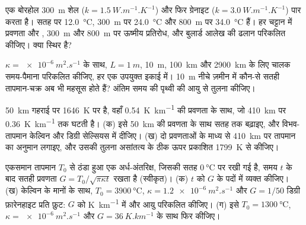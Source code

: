 \begin{exercise}[$\star\star$]\label{exo:b1:heat-budget:6}
एक बोरहोल \qty{300}{m} शेल ($k = \qty{1.5}{W.m^{-1}.K^{-1}}$) और फिर ग्रेनाइट ($k = \qty{3.0}{W.m^{-1}.K^{-1}}$) पार करता है।  सतह पर \qty{12.0}{\degreeCelsius}, \qty{300}{m} पर \qty{24.0}{\degreeCelsius} और \qty{800}{m} पर \qty{34.0}{\degreeCelsius} हैं। हर चट्टान में प्रवणता और , \qty{300}{m} और \qty{800}{m} पर ऊष्मीय प्रतिरोध, और बुलार्ड आलेख की ढलान परिकलित कीजिए। क्या  स्थिर है?
\end{exercise}

\begin{exercise}[$\star\star$]\label{exo:b1:heat-budget:7}
$\kappa = \qty{e-6}{m^2.s^{-1}}$ के साथ, $L = \qty{1}{m}$, \qty{10}{m}, \qty{100}{km} और \qty{2900}{km} के लिए चालक समय-पैमाना परिकलित कीजिए, हर एक उपयुक्त इकाई में। \qty{10}{m} नीचे ज़मीन में कौन-से सतही तापमान-चक्र अब भी महसूस होते हैं? अंतिम समय की पृथ्वी की आयु से तुलना कीजिए।
\end{exercise}

\begin{exercise}[$\star\star$]\label{exo:b1:heat-budget:8}
 \qty{50}{km} गहराई पर \qty{1646}{K} पर है, वहाँ \qty{0.54}{K.km^{-1}} की प्रवणता के साथ, जो \qty{410}{km} पर \qty{0.36}{K.km^{-1}} तक घटती है। (क) इसे \qty{50}{km} की प्रवणता के साथ सतह तक बढ़ाइए, और विभव-तापमान केल्विन और डिग्री सेल्सियस में दीजिए। (ख) दो प्रवणताओं के माध्य से \qty{410}{km} पर तापमान का अनुमान लगाइए, और उसकी तुलना असांतत्य के ठीक ऊपर प्रकाशित \qty{1799}{K} से कीजिए।
\end{exercise}

\begin{exercise}[$\star\star$]\label{exo:b1:heat-budget:9}
एकसमान तापमान $T_0$ से ठंडा हुआ एक अर्ध-अंतरिक्ष, जिसकी सतह $\qty{0}{\degreeCelsius}$ पर रखी गई है, समय $t$ के बाद सतही प्रवणता $G =
T_0/\sqrt{\pi\kappa t}$ रखता है (स्वीकृत)। (क) $t$ को $G$ के पदों में व्यक्त कीजिए। (ख) केल्विन के मानों के साथ, $T_0 = \qty{3900}{\degreeCelsius}$, $\kappa =
\qty{1.2e-6}{m^2.s^{-1}}$ और $G = 1/50$ डिग्री फ़ारेनहाइट प्रति फ़ुट: $G$ को \unit{K.km^{-1}} में और आयु परिकलित कीजिए। (ग) इसे $T_0 =
\qty{1300}{\degreeCelsius}$, $\kappa = \qty{e-6}{m^2.s^{-1}}$ और $G =
\qty{36}{K.km^{-1}}$ के साथ फिर कीजिए।
\end{exercise}

